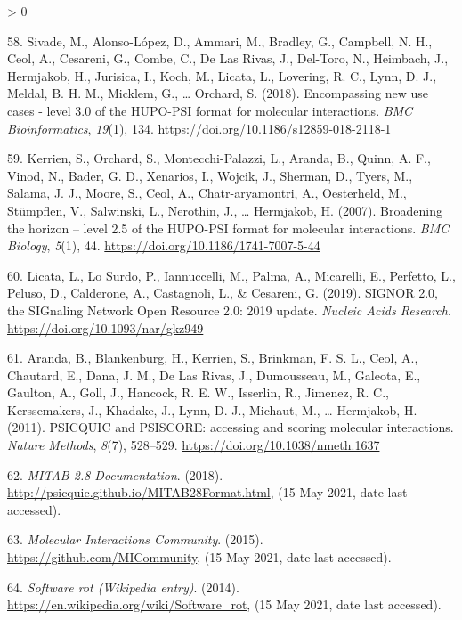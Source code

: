 \documentclass[
  12pt,
]{book}
\newlength{\cslhangindent}
\newenvironment{CSLReferences}[2] %
 {%
  \setlength{\parindent}{0pt}
  \ifodd #1 \everypar{\setlength{\hangindent}{\cslhangindent}}\ignorespaces\fi
  \ifnum #2 > 0
  \setlength{\parskip}{#2\baselineskip}
  \fi
 }%
 {}
\begin{document}
\begin{CSLReferences}{1}{0}
\leavevmode\hypertarget{ref-Sivade2018}{}%
58. Sivade, M., Alonso-López, D., Ammari, M., Bradley, G., Campbell, N. H., Ceol, A., Cesareni, G., Combe, C., De Las Rivas, J., Del-Toro, N., Heimbach, J., Hermjakob, H., Jurisica, I., Koch, M., Licata, L., Lovering, R. C., Lynn, D. J., Meldal, B. H. M., Micklem, G., \ldots{} Orchard, S. (2018). {Encompassing new use cases - level 3.0 of the HUPO-PSI format for molecular interactions}. \emph{BMC Bioinformatics}, \emph{19}(1), 134. \url{https://doi.org/10.1186/s12859-018-2118-1}

\leavevmode\hypertarget{ref-Kerrien2007}{}%
59. Kerrien, S., Orchard, S., Montecchi-Palazzi, L., Aranda, B., Quinn, A. F., Vinod, N., Bader, G. D., Xenarios, I., Wojcik, J., Sherman, D., Tyers, M., Salama, J. J., Moore, S., Ceol, A., Chatr-aryamontri, A., Oesterheld, M., Stümpflen, V., Salwinski, L., Nerothin, J., \ldots{} Hermjakob, H. (2007). {Broadening the horizon -- level 2.5 of the HUPO-PSI format for molecular interactions}. \emph{BMC Biology}, \emph{5}(1), 44. \url{https://doi.org/10.1186/1741-7007-5-44}

\leavevmode\hypertarget{ref-Licata2019}{}%
60. Licata, L., Lo Surdo, P., Iannuccelli, M., Palma, A., Micarelli, E., Perfetto, L., Peluso, D., Calderone, A., Castagnoli, L., \& Cesareni, G. (2019). {SIGNOR 2.0, the SIGnaling Network Open Resource 2.0: 2019 update}. \emph{Nucleic Acids Research}. \url{https://doi.org/10.1093/nar/gkz949}

\leavevmode\hypertarget{ref-Aranda2011}{}%
61. Aranda, B., Blankenburg, H., Kerrien, S., Brinkman, F. S. L., Ceol, A., Chautard, E., Dana, J. M., De Las Rivas, J., Dumousseau, M., Galeota, E., Gaulton, A., Goll, J., Hancock, R. E. W., Isserlin, R., Jimenez, R. C., Kerssemakers, J., Khadake, J., Lynn, D. J., Michaut, M., \ldots{} Hermjakob, H. (2011). {PSICQUIC and PSISCORE: accessing and scoring molecular interactions}. \emph{Nature Methods}, \emph{8}(7), 528--529. \url{https://doi.org/10.1038/nmeth.1637}

\leavevmode\hypertarget{ref-mitab28-doc}{}%
62. \emph{{MITAB 2.8 Documentation}}. (2018). \url{http://psicquic.github.io/MITAB28Format.html}, (15 May 2021, date last accessed).

\leavevmode\hypertarget{ref-mi-github}{}%
63. \emph{{Molecular Interactions Community}}. (2015). \url{https://github.com/MICommunity}, (15 May 2021, date last accessed).

\leavevmode\hypertarget{ref-soft-rot-wiki}{}%
64. \emph{{Software rot (Wikipedia entry)}}. (2014). \url{https://en.wikipedia.org/wiki/Software_rot}, (15 May 2021, date last accessed).


\end{CSLReferences}
\end{document}
